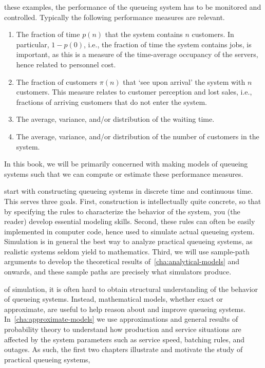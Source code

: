 \documentclass[queueing_book]{subfiles}
\begin{document}
 these examples, the performance of the queueing system has to be monitored and controlled.
Typically the following performance measures are relevant.
\begin{enumerate}
\item The fraction of time $p(n)$ that the system contains $n$ customers.
 In particular, $1-p(0)$, i.e., the fraction of time the system contains jobs, is important, as this is a measure of the time-average occupancy of the servers, hence related to personnel cost.
\item The fraction of customers $\pi(n)$ that `see upon arrival' the system with $n$ customers.
  This measure relates to customer perception and lost sales, i.e., fractions of arriving customers that do not enter the system.
\item The average, variance, and/or distribution of the waiting time.
\item The average, variance, and/or distribution of the number of customers in the system.\
\end{enumerate}
In this book, we will be primarily concerned with making models of queueing systems such that we can compute or estimate these performance measures.

 start with constructing queueing systems in discrete time and continuous time.
This serves three goals.
First, construction is intellectually quite concrete, so that by specifying the rules to characterize the behavior of the system, you (the reader) develop essential modeling skills.
Second, these rules can often be easily implemented in computer code, hence used to simulate actual queueing system.
Simulation is in general the best way to analyze practical queueing systems, as realistic systems seldom yield to mathematics.
Third, we will use sample-path arguments to develop the theoretical results of~\cref{cha:analytical-models} and onwards, and these sample paths are precisely what simulators produce.

 of simulation, it is often hard to obtain structural understanding of the behavior of queueing systems.
Instead, mathematical models, whether exact or approximate, are useful to help reason about and improve queueing systems.
In~\cref{cha:approximate-models} we use approximations and general results of probability theory to understand how production and service situations are affected by the system parameters such as service speed, batching rules, and outages.
As such, the first two chapters illustrate and motivate the study of practical queueing systems,
\end{document}
